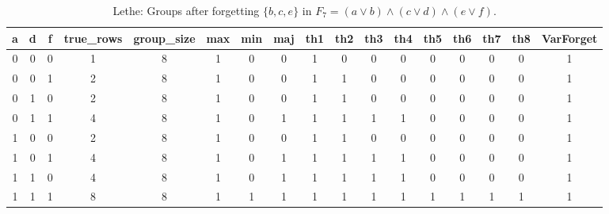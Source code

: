 \begin{table}[!tb]
    \centering
    \begin{tabular}{|c|c|c|c|c|c|c|c|c|c|c|c|c|c|c|c|c|}
        \hline
        \textbf{a} & \textbf{d} & \textbf{f} & \textbf{true\_rows} & \textbf{group\_size} & \textbf{max} & \textbf{min} & \textbf{maj} & \textbf{th1} & \textbf{th2} & \textbf{th3} & \textbf{th4} & \textbf{th5} & \textbf{th6} & \textbf{th7} & \textbf{th8} & \textbf{VarForget} \\ \hline
        \rowcolor{gray!40} 0 & 0 & 0 & 1 & 8 & 1 & 0 & 0 & 1 & 0 & 0 & 0 & 0 & 0 & 0 & 0 & 1 \\ \hline
        \rowcolor{blue!40} 0 & 0 & 1 & 2 & 8 & 1 & 0 & 0 & 1 & 1 & 0 & 0 & 0 & 0 & 0 & 0 & 1 \\ \hline
        \rowcolor{red!40} 0 & 1 & 0 & 2 & 8 & 1 & 0 & 0 & 1 & 1 & 0 & 0 & 0 & 0 & 0 & 0 & 1 \\ \hline
        \rowcolor{green!40} 0 & 1 & 1 & 4 & 8 & 1 & 0 & 1 & 1 & 1 & 1 & 1 & 0 & 0 & 0 & 0 & 1 \\ \hline
        \rowcolor{yellow!40} 1 & 0 & 0 & 2 & 8 & 1 & 0 & 0 & 1 & 1 & 0 & 0 & 0 & 0 & 0 & 0 & 1 \\ \hline
        \rowcolor{gray!40} 1 & 0 & 1 & 4 & 8 & 1 & 0 & 1 & 1 & 1 & 1 & 1 & 0 & 0 & 0 & 0 & 1 \\ \hline
        \rowcolor{blue!40} 1 & 1 & 0 & 4 & 8 & 1 & 0 & 1 & 1 & 1 & 1 & 1 & 0 & 0 & 0 & 0 & 1 \\ \hline
        \rowcolor{red!40} 1 & 1 & 1 & 8 & 8 & 1 & 1 & 1 & 1 & 1 & 1 & 1 & 1 & 1 & 1 & 1 & 1 \\ \hline
    \end{tabular}
    \caption{Lethe: Groups after forgetting $\{b, c, e\}$ in $F_{7} = (a \lor b) \land (c \lor d) \land (e \lor f)$.}
    \label{tab:lethe-F7-bce-groups}
\end{table}
